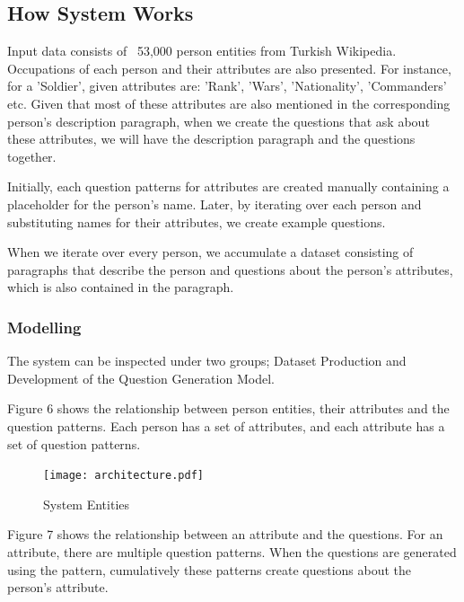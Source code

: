 \documentclass{mefsdp}
\begin{document}
	\subsection{How System Works}
	Input data consists of ~53,000 person entities from Turkish Wikipedia. Occupations of each person and their attributes are also presented. For instance, for a 'Soldier', given attributes are: 'Rank', 'Wars', 'Nationality', 'Commanders' etc. Given that most of these attributes are also mentioned in the corresponding person's description paragraph, when we create the questions that ask about these attributes, we will have the description paragraph and the questions together. 
	
	Initially, each question patterns for attributes are created manually containing a placeholder for the person's name. Later, by iterating over each person and substituting names for their attributes, we create example questions. 
	
	When we iterate over every person, we accumulate a dataset consisting of paragraphs that describe the person and questions about the person's attributes, which is also contained in the paragraph.  
	
	\subsubsection{Modelling}
	
	The system can be inspected under two groups; Dataset Production and Development of the Question Generation Model. \newline \par
	
	Figure 6 shows the relationship between person entities, their attributes and the question patterns. Each person has a set of attributes, and each attribute has a set of question patterns. \newline \par
	
	\begin{figure}[h]
		\centering
		\texttt{[image: architecture.pdf]}
		\caption{System Entities\label{per-attr-qp}}
	\end{figure}
	
	
	
	Figure 7 shows the relationship between an attribute and the questions. For an attribute, there are multiple question patterns. When the questions are generated using the pattern, cumulatively these patterns create questions about the person's attribute. \newline \par
	
\end{document}
